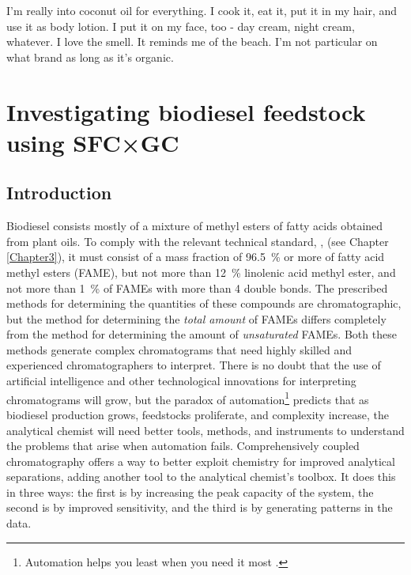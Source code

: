 
\begin{savequote}[\quotewidth] I'm really into coconut oil for everything. I cook it,
eat it, put it in my hair, and use it as body lotion. I put it on my face, too -
day cream, night cream, whatever. I love the smell. It reminds me of the beach.
I'm not particular on what brand as long as it's organic.

\end{savequote}

\chapter{Investigating biodiesel feedstock using SFC×GC} %

\label{Chapter6} %

\section{Introduction}


Biodiesel consists mostly of a mixture of methyl esters of fatty acids obtained
from plant oils. To comply with the relevant technical standard, ,
\autocite{SANS1935} (see Chapter \ref{Chapter3}), it must consist of a mass
fraction of \SI{96.5}{\percent} or more of fatty acid methyl esters (FAME), but
not more than \SI{12}{\percent} linolenic acid methyl ester, and not more than
\SI{1}{\percent} of FAMEs with more than \num{4} double bonds. The prescribed
methods for determining the quantities of these compounds are chromatographic,
but the method for  determining the \emph{total amount} of FAMEs differs
completely from the method for determining the amount of \emph{unsaturated}
FAMEs. Both these methods generate complex chromatograms that need highly
skilled and experienced chromatographers to interpret. There is no doubt that
the use of artificial intelligence and other technological innovations for
interpreting chromatograms will grow, but the paradox of
automation\footnote{Automation helps you least when you need it most
\autocite{Strauch2018, Bainbridge1983}.} predicts that as biodiesel production
grows, feedstocks proliferate, and complexity increase, the analytical chemist
will need better tools, methods, and instruments to understand the problems that
arise when automation fails. Comprehensively coupled chromatography offers a way
to better exploit chemistry for improved analytical separations, adding another
tool to the analytical chemist's toolbox. It does this in three ways: the first is
by increasing the peak capacity of the system, the second is by improved
sensitivity, and the third is by generating patterns in the data.

